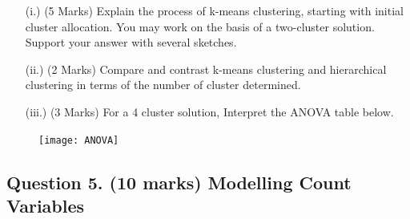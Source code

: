 \documentclass[a4paper,12pt]{article}
\begin{document}
\begin{itemize}
	\item[(i.)] (5 Marks) Explain the process of k-means clustering, starting with initial cluster allocation. You may work on the basis of a two-cluster solution. Support your answer with several sketches.
	\item[(ii.)] (2 Marks) Compare and contrast k-means clustering and hierarchical clustering in terms of the number of cluster determined.
	\item[(iii.)] (3 Marks) For a 4 cluster solution, Interpret the ANOVA table below.
\end{itemize}


\begin{figure}[h!]
\centering
\texttt{[image: ANOVA]}
\end{figure}


\newpage

\subsection*{Question 5. (10 marks) Modelling Count Variables }
\end{document}
